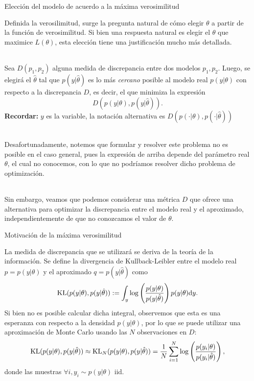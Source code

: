 \documentclass[handout, 9pt]{beamer}
\begin{document}
\begin{frame}{Elección del modelo de acuerdo a la máxima verosimilitud}

Definida la verosilimitud, surge la pregunta natural de cómo elegir $\theta$ a partir de la función de verosimilitud. Si bien una respuesta natural es elegir el $\theta$ que maximice $L(\theta)$, esta elección tiene una justificación mucho más detallada.\\~\ \pause

Sea $D(p_1,p_2)$ alguna medida de discrepancia entre dos modelos $p_1,p_2$. Luego, se elegirá el $\hat\theta$ tal que $p(y|\hat\theta)$ es lo más \emph{cercano} posible al modelo real $p(y|\theta)$ con respecto a la discrepancia $D$, es decir, el que minimiza la expresión
\begin{equation*}
    	D(p(y|\theta),p(y|\hat\theta)).
\end{equation*} \pause
\textbf{Recordar:} $y$ es la variable, la notación alternativa es $D(p(\cdot|\theta),p(\cdot|\hat\theta))$\\~\

Desafortunadamente, notemos que formular y resolver  este problema no es posible en el caso general, pues la expresión de arriba depende del parámetro real $\theta$, el cual no conocemos, con lo que no podríamos resolver dicho problema de optimización.\\~\

Sin embargo, veamos que podemos considerar una métrica $D$ que ofrece una alternativa para optimizar la discrepancia entre el modelo real y el aproximado, independientemente de que no conozcamos el valor de $\theta$.

\end{frame}

\begin{frame}{Motivación de la máxima verosimilitud}

La medida de discrepancia que se utilizará se deriva de la teoría de la información. Se define la divergencia de Kullback-Leibler entre el modelo real $p =  p(y|\theta)$ y el aproximado $q  = p(y|\hat\theta)$ como
\begin{equation*}
 	\operatorname{\text{KL}}( p(y|\theta),p(y|\hat\theta)) :=  \int_y\log\left(\frac{p(y|\theta)}{p(y|\hat\theta)}\right)p(y|\theta){\text d} y.\label{eq:KL_maxlike}
 \end{equation*} \pause
Si bien no es posible calcular dicha integral, observemos que esta es una esperanza con respecto a la densidad $p(y|\theta)$, por lo que se puede utilizar una aproximación de Monte Carlo usando las $N$ observaciones en $D$:
\begin{equation*}
	\operatorname{\text{KL}}( p(y|\theta),p(y|\hat\theta)) 	\approx \operatorname{\text{KL}}_N( p(y|\theta),p(y|\hat\theta)) = \frac{1}{N}\sum_{i=1}^N\log\left(\frac{p(y_i|\theta)}{p(y_i|\hat\theta)}\right),
\end{equation*}
donde las muestras $\forall i, y_i\sim p(y|\theta)$ iid.
	
\end{frame}
\end{document}

